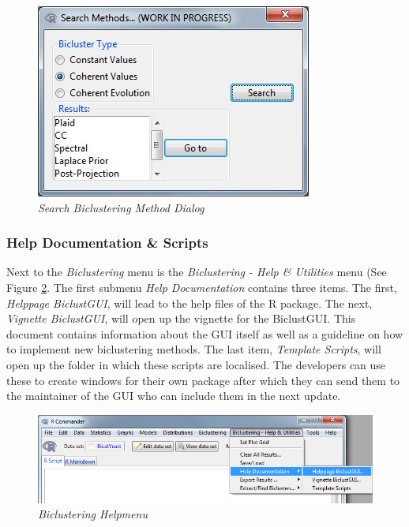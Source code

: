 \documentclass[a4paper]{article}\usepackage[]{graphicx}\usepackage[]{color}
\begin{document}
\begin{figure}[H]
\centering
\includegraphics[scale=0.6]{figures/searchwindow.png}
\caption{{\it Search Biclustering Method Dialog }\label{searchwindow}}
\end{figure}

\subsubsection{Help Documentation \& Scripts}
Next to the {\it Biclustering} menu is the {\it Biclustering - Help \&
Utilities} menu (See Figure \ref{biclustering_helpmenu}. The first submenu {\it Help
Documentation} contains three items. The first, {\it Helppage BiclustGUI}, will
lead to the help files of the R package. The next, {\it Vignette BiclustGUI},
will open up the vignette for the BiclustGUI. This document contains information
about the GUI itself as well as a guideline on how to implement new biclustering
methods. The last item, {\it Template Scripts}, will open up the folder in which
these scripts are localised. The developers can use these to create windows for
their own package after which they can send them to the maintainer of the GUI
who can include them in the next update.

\begin{figure}[H]
\centering
\includegraphics[scale=0.5]{figures/biclustering_helpmenu.png}
\caption{{\it Biclustering Helpmenu }\label{biclustering_helpmenu}}
\end{figure}
\end{document}
